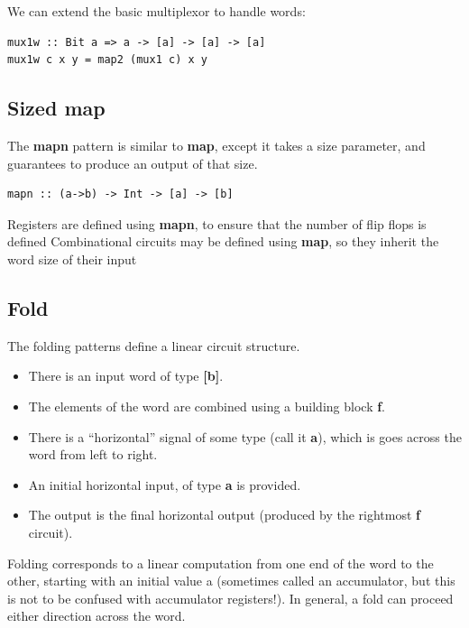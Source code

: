 \documentclass[]{svmono}
\begin{document}
We can extend the basic multiplexor to handle words:


\begin{verbatim}
mux1w :: Bit a => a -> [a] -> [a] -> [a]
mux1w c x y = map2 (mux1 c) x y
\end{verbatim}
\subsection*{Sized map}
\label{sec:orgdfa3908}

The \textbf{mapn} pattern is similar to \textbf{map}, except it
takes a size parameter, and guarantees to produce an output of that
size.


\begin{verbatim}
mapn :: (a->b) -> Int -> [a] -> [b]
\end{verbatim}



Registers are defined using \textbf{mapn}, to ensure that the number
 of flip flops is defined
Combinational circuits may be defined using \textbf{map}, so
 they inherit the word size of their input
\subsection*{Fold}
\label{sec:org3e2131b}

The folding patterns define a linear circuit structure.

\begin{itemize}
\item There is an input word of type \textbf{{[}b]}.
\item The elements of the word are combined using a building block \textbf{f}.

\item There is a ``horizontal'' signal of some type (call it \textbf{a}), which
is goes across the word from left to right.

\item An initial horizontal input, of type \textbf{a} is provided.

\item The output is the final horizontal output (produced by the rightmost
\textbf{f} circuit).
\end{itemize}

Folding corresponds to a linear computation from one end of the word
to the other, starting with an initial value a (sometimes called an
accumulator, but this is not to be confused with accumulator
registers!).  In general, a fold can proceed either direction across
the word.
\end{document}
